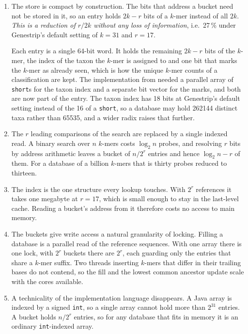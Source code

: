 \documentclass[pdflatex,sn-vancouver-num]{sn-jnl}
\begin{document}
\begin{enumerate}
	\item The store is compact by construction. The bits that address a bucket need not be stored in it, so an entry holds $2k - r$ bits of a $k$-mer instead of all $2k$. \emph{This is a reduction of $r/2k$ without any loss of information}, i.e.\ 27\,\% under Genestrip's default setting of $k = 31$ and $r = 17$.

	Each entry is a single 64-bit word. It holds the remaining $2k - r$ bits of the $k$-mer, the index of the taxon the $k$-mer is assigned to and one bit that marks the $k$-mer as already seen, which is how the unique $k$-mer counts of a classification are kept. The implementation from \citep{genestrip-pub} needed a parallel array of \texttt{short}s for the taxon index and a separate bit vector for the marks, and both are now part of the entry. The taxon index has 18 bits at Genestrip's default setting instead of the 16 of a \texttt{short}, so a database may hold \num{262144} distinct taxa rather than \num{65535}, and a wider radix raises that further.
	\item The $r$ leading comparisons of the search are replaced by a single indexed read. A binary search over $n$ $k$-mers costs $\log_2 n$ probes, and resolving $r$ bits by address arithmetic leaves a bucket of $n/2^{r}$ entries and hence $\log_2 n - r$ of them. For a database of a billion $k$-mers that is thirty probes reduced to thirteen.
	\item The index is the one structure every lookup touches. With $2^{r}$ references it takes one megabyte at $r = 17$, which is small enough to stay in the last-level cache. Reading a bucket's address from it therefore costs no access to main memory.
	\item The buckets give write access a natural granularity of locking. Filling a database is a parallel read of the reference sequences. With one array there is one lock, with $2^{r}$ buckets there are $2^{r}$, each guarding only the entries that share a $k$-mer suffix. Two threads inserting $k$-mers that differ in their trailing bases do not contend, so the fill and the lowest common ancestor update scale with the cores available.
	\item A technicality of the implementation language disappears. A Java array is indexed by a signed \texttt{int}, so a single array cannot hold more than $2^{31}$ entries. A bucket holds $n/2^{r}$ entries, so for any database that fits in memory it is an ordinary \texttt{int}-indexed array.
\end{enumerate}
\end{document}
